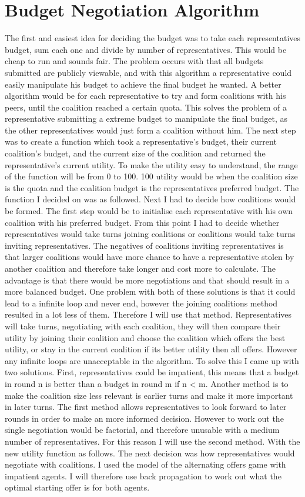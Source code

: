 \section{Budget Negotiation Algorithm }
The first and easiest idea for deciding the budget was to take each representatives budget, sum each one and divide by number of representatives. This would be cheap to run and sounds fair. The problem occurs with that all budgets submitted are publicly viewable, and with this algorithm a representative could easily manipulate his budget to achieve the final budget he wanted. 
A better algorithm would be for each representative to try and form coalitions with his peers, until the coalition reached a certain quota. This solves the problem of a representative submitting a extreme budget to manipulate the final budget, as the other representatives would just form a coalition without him.  
The next step was to create a function which took a representative’s budget, their current coalition’s budget, and the current size of the coalition and returned the representative’s current utility. To make the utility easy to understand, the range of the function will be from 0 to 100. 100 utility would be when the coalition size is the quota and the coalition budget is the representatives preferred budget. The function I decided on was as followed.
Next I had to decide how coalitions would be formed. The first step would be to initialise each representative with his own coalition with his preferred budget. From this point I had to decide whether representatives would take turns joining coalitions or coalitions would take turns inviting representatives. The negatives of coalitions inviting representatives is that larger coalitions would have more chance to have a representative stolen by another coalition and therefore take longer and cost more to calculate. The advantage is that there would be more negotiations and that should result in a more balanced budget. One problem with both of these solutions is that it could lead to a infinite loop and never end, however the joining coalitions method resulted in a lot less of them. Therefore I will use that method. Representatives will take turns, negotiating with each coalition, they will then compare their utility by joining their coalition and choose the coalition which offers the best utility, or stay in the current coalition if its better utility then all offers. 
However any infinite loops are unacceptable in the algorithm. To solve this I came up with two solutions. First, representatives could be impatient, this means that a budget in round n is better than a budget in round m if n < m. Another method is to make the coalition size less relevant is earlier turns and make it more important in later turns. The first method allows representatives to look forward to later rounds in order to make an more informed decision. However to work out the single negotiation would be factorial, and therefore unusable with a medium number of representatives. For this reason I will use the second method. With the new utility function as follows.  
The next decision was how representatives would negotiate with coalitions. I used the model of the alternating offers game with impatient agents. I will therefore use back propagation to work out what the optimal starting offer is for both agents.






